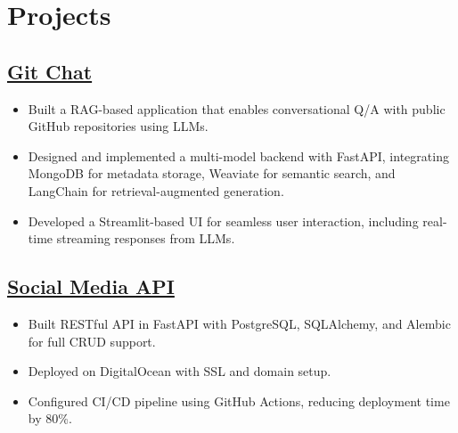 \documentclass[a4paper,11pt]{article}
\begin{document}
\section*{Projects}
\vspace{-2mm}

\subsection*{\href{https://github.com/kanakOS01/gitchat}{Git Chat}}
\begin{itemize}[left=1pt,itemsep=1pt,topsep=0pt,parsep=0pt]
    \item Built a RAG-based application that enables conversational Q/A with public GitHub repositories using LLMs.
    \item Designed and implemented a multi-model backend with FastAPI, integrating MongoDB for metadata storage, Weaviate for semantic search, and LangChain for retrieval-augmented generation.
    \item Developed a Streamlit-based UI for seamless user interaction, including real-time streaming responses from LLMs.
\end{itemize}

\subsection*{\href{https://github.com/kanakOS01/social-media-fastapi}{Social Media API}}
\begin{itemize}[left=1pt,itemsep=1pt,topsep=0pt,parsep=0pt]
    \item Built RESTful API in FastAPI with PostgreSQL, SQLAlchemy, and Alembic for full CRUD support.
    \item Deployed on DigitalOcean with SSL and domain setup.
    \item Configured CI/CD pipeline using GitHub Actions, reducing deployment time by 80\%.
\end{itemize}

\end{document}
